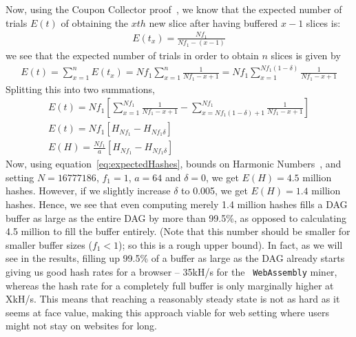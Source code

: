 \documentclass[runningheads]{llncs}
\begin{document}
Now, using the Coupon Collector proof~\cite{couponCollector}, we know that the expected number of trials $E(t)$ of obtaining the $xth$ new slice after having buffered $x-1$ slices is:\\
\begin{gather}
	E(t_x) = \frac{Nf_1}{Nf_1-(x-1)}
\end{gather}
we see that the expected number of trials in order to obtain $n$ slices is given by
\begin{gather}
	E(t) = \sum_{x=1}^{n}E(t_x) = Nf_1\sum_{x=1}^{n}\frac{1}{Nf_1-x+1} = Nf_1\sum_{x=1}^{Nf_1(1-\delta)}\frac{1}{Nf_1-x+1}
\end{gather}
Splitting this into two summations,
\begin{gather}
	E(t) = Nf_1[\sum_{x=1}^{Nf_1}\frac{1}{Nf_1-x+1} - \sum_{x=Nf_1(1-\delta)+1}^{Nf_1}\frac{1}{Nf_1-x+1}] \\
    E(t) = Nf_1[H_{Nf_1} -H_{Nf_1\delta}] \\
    \label{eq:expectedHashes}
	E(H) = \frac{Nf_1}{a}[H_{Nf_1} -H_{Nf_1\delta}]
\end{gather}
Now, using equation~\ref{eq:expectedHashes}, bounds on Harmonic Numbers~\cite{harmonicNumber}, and setting $N = 16777186$, $f_1 = 1$, $a = 64$ and $\delta = 0$, we get $E(H) = 4.5$ million hashes. However, if we slightly increase $\delta$ to 0.005, we get $E(H) = 1.4$ million hashes. Hence, we see that even computing merely 1.4 million hashes fills a DAG buffer as large as the entire DAG by more than 99.5\%, as opposed to calculating 4.5 million to fill the buffer entirely. (Note that this number should be smaller for smaller buffer sizes ($f_1 < 1$); so this is a rough upper bound). 
In fact, as we will see in the results, filling up 99.5\% of a buffer as large as the DAG already starts giving us good hash rates for a browser -- 35kH/s for the ~\verb|WebAssembly| miner, whereas the hash rate for a completely full buffer is only marginally higher at XkH/s. 
This means that reaching a reasonably steady state is not as hard as it seems at face value, making this approach viable for web setting where users might not stay on websites for long. 
\end{document}
